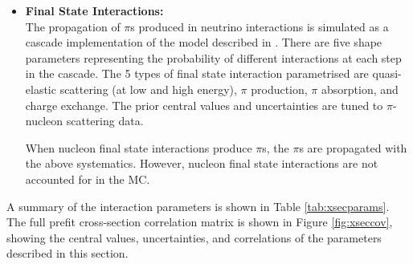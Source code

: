\begin{itemize}
\item \textbf{Final State Interactions:} \\
The propagation of $\pi$s produced in neutrino interactions is simulated as a cascade implementation of the model described in \cite{fsicascade}. There are five shape parameters representing the probability of different interactions at each step in the cascade. The 5 types of final state interaction parametrised are quasi-elastic scattering (at low and high energy), $\pi$ production, $\pi$ absorption, and charge exchange. The prior central values and uncertainties are tuned to $\pi$-nucleon scattering data\cite{fsiscatt}.

When nucleon final state interactions produce $\pi$s, the $\pi$s are propagated with the above systematics. However, nucleon final state interactions are not accounted for in the MC.

\end{itemize}

A summary of the interaction parameters is shown in Table \ref{tab:xsecparams}. The full prefit cross-section correlation matrix is shown in Figure \ref{fig:xseccov}, showing the central values, uncertainties, and correlations of the parameters described in this section.

